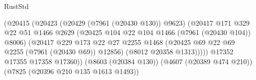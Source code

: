 \begin{lexlean}{RustStd}
\begin{coremodule}
                                                    (@20415
                                                      (@20423
                                                        (@20429 (@7961 (@20430 @130)) @9623)
                                                        (@20417
                                                          @171
                                                          @329
                                                          @22
                                                          @51
                                                          @1466
                                                          @2629
                                                          (@20425
                                                            @104
                                                            @22
                                                            @104
                                                            @1466
                                                            (@7961 (@20430 @104))
                                                            @8006)
                                                          (@20417
                                                            @229
                                                            @173
                                                            @22
                                                            @27
                                                            @2255
                                                            @1468
                                                            (@20425
                                                              @69
                                                              @22
                                                              @69
                                                              @2255
                                                              (@7961 (@20430 @69))
                                                              @12856)
                                                            (@8012 @20358 @1313)))))
                                                    @17352
                                                    @17355
                                                    @17358
                                                    @17360))
                                                (@8603 (@20384 @130))
                                                (@4607 (@20389 @474 @210))
                                                (@7825 (@20396 @210 @135 @1613 @1493))

\end{coremodule}
\end{lexlean}
